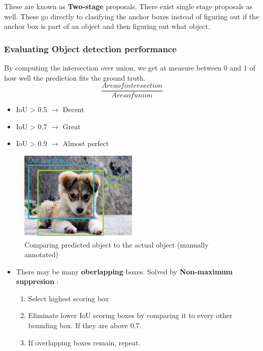 \documentclass[a4paper]{article}
\begin{document}
These are known as \textbf{Two-stage} proposals. 
There exist single stage proposals as well. These go directly to clasifying the anchor boxes instead of figuring out if the anchor box is part of an object and then figuring out what object. 


\subsubsection*{Evaluating Object detection performance}
By computing the intersection over union, we get at measure between 0 and 1 of how well the prediction fits the ground truth.
\begin{equation}
	\frac{Area of intersection}{Area of union} 
\end{equation}
\begin{itemize}
	\item IoU > 0.5 $ \rightarrow $ Decent
	\item IoU > 0.7 $ \rightarrow $ Great
	\item IoU > 0.9 $ \rightarrow $ Almost perfect
\end{itemize}

\begin{figure}[H]
\centering
\includegraphics[width=0.5\textwidth]{figures/Intersection_over_union.png}
\caption{Comparing predicted object to the actual object (manually annotated)}
\label{fig:intersection_over_union}
\end{figure} 

\begin{itemize}
	\item There may be many \textbf{oberlapping} boxes.  Solved by \textbf{Non-maximum suppresion} :
		\begin{enumerate}
			\item Select highest scoring box
			\item Eliminate lower IoU scoring boxes by comparing it to every other bounding box. If they are above 0.7.
			\item If overlapping boxes remain, repeat.
		\end{enumerate}
\end{itemize}
\end{document}
